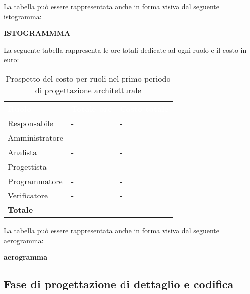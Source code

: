 La tabella può essere rappresentata anche in forma visiva dal seguente istogramma:

\textbf{ISTOGRAMMMA}


La seguente tabella rappresenta le ore totali dedicate ad ogni ruolo e il costo in euro:

\begin{table}[!htbp]
\begin{center}
\renewcommand{\arraystretch}{1.5}
\begin{tabular}{ m{}<{\centering}  m{}<{\centering} m{}<{\centering}}
	\rowcolor{darkblue}
	\textcolor{white}{\textbf{Ruolo}}&\textcolor{white}{\textbf{Totale ore}}&\textcolor{white}{\textbf{Costo totale}}\\ 

	Responsabile  & - & - \\	

	\rowcolor{gray!10} Amministratore & - & - \\
	
	Analista & - & - \\
	
	\rowcolor{gray!10} Progettista & - & - \\
	
	Programmatore & - & - \\
	
	\rowcolor{gray!10} Verificatore & - & - \\
	
	\textbf{Totale} & - & - \\
	
\end{tabular}
\caption{Prospetto del costo per ruoli nel primo periodo di progettazione architetturale}
\end{center}
\end{table}

La tabella può essere rappresentata anche in forma visiva dal seguente aerogramma:

\textbf{aerogramma}






\subsection{Fase di progettazione di dettaglio e codifica}
